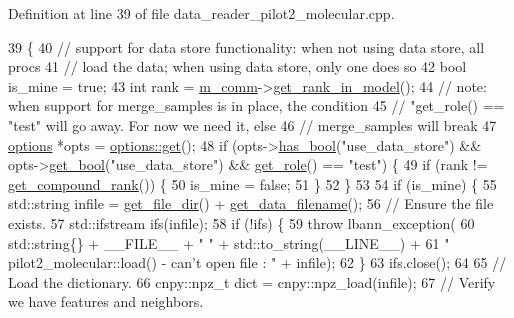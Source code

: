 Definition at line 39 of file data\+\_\+reader\+\_\+pilot2\+\_\+molecular.\+cpp.


\begin{DoxyCode}
39                                    \{
40   \textcolor{comment}{// support for data store functionality: when not using data store, all procs}
41   \textcolor{comment}{// load the data; when using data store, only one does so}
42   \textcolor{keywordtype}{bool} is\_mine = \textcolor{keyword}{true};
43   \textcolor{keywordtype}{int} rank = \hyperlink{classlbann_1_1generic__data__reader_ad3976d4b7db2d404dbb87a56c33fd456}{m\_comm}->\hyperlink{classlbann_1_1lbann__comm_a789453454468a3b70de768537c50ca52}{get\_rank\_in\_model}();
44   \textcolor{comment}{// note: when support for merge\_samples is in place, the condition}
45   \textcolor{comment}{//       "get\_role() == "test" will go away. For now we need it, else}
46   \textcolor{comment}{//       merge\_samples will break}
47   \hyperlink{classoptions}{options} *opts = \hyperlink{classoptions_a9ecfe9c365269df68a41b961c31ae3f5}{options::get}();
48   \textcolor{keywordflow}{if} (opts->\hyperlink{classoptions_aafb1d2a7ccde0b1bf786230ba4080ecd}{has\_bool}(\textcolor{stringliteral}{"use\_data\_store"}) && opts->\hyperlink{classoptions_a99aa190102de33e2aed39723929f9fad}{get\_bool}(\textcolor{stringliteral}{"use\_data\_store"}) && 
      \hyperlink{classlbann_1_1generic__data__reader_a92982e1b399f37e2ead5aa440883cba5}{get\_role}() == \textcolor{stringliteral}{"test"}) \{
49     \textcolor{keywordflow}{if} (rank != \hyperlink{classlbann_1_1generic__data__reader_ac4fc0729e7f1240e167fe897df99f950}{get\_compound\_rank}()) \{
50       is\_mine = \textcolor{keyword}{false};
51     \}
52   \}
53 
54   \textcolor{keywordflow}{if} (is\_mine) \{
55     std::string infile = \hyperlink{classlbann_1_1generic__data__reader_ab4c6c2d4ba40ece809ce896828c8ff03}{get\_file\_dir}() + \hyperlink{classlbann_1_1generic__data__reader_a56664e1b43f3fe923cf6d652f14b40a9}{get\_data\_filename}();
56     \textcolor{comment}{// Ensure the file exists.}
57     std::ifstream ifs(infile);
58     \textcolor{keywordflow}{if} (!ifs) \{
59       \textcolor{keywordflow}{throw} lbann\_exception(
60         std::string\{\} + \_\_FILE\_\_ + \textcolor{stringliteral}{" "} + std::to\_string(\_\_LINE\_\_) +
61         \textcolor{stringliteral}{" pilot2\_molecular::load() - can't open file : "} + infile);
62     \}
63     ifs.close();
64   
65     \textcolor{comment}{// Load the dictionary.}
66     cnpy::npz\_t dict = cnpy::npz\_load(infile);
67     \textcolor{comment}{// Verify we have features and neighbors.}

\end{DoxyCode}
